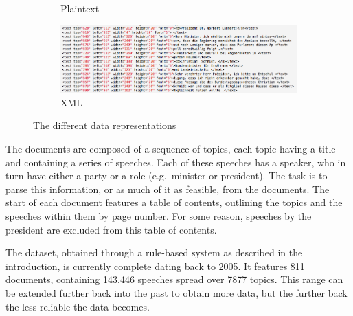\begin{figure}[htbp]
\begin{subfigure}[b]{0.59\textwidth}
    \caption{Plaintext}
    \vspace{2ex}
    \includegraphics[width=\textwidth]{figures/xml.png}
    \caption{XML}
  \end{subfigure}
  \caption{The different data representations}
  \label{fig:example}
\end{figure}

The documents are composed of a sequence of topics, each topic having a title
and containing a series of speeches. Each of these speeches has a speaker, who
in turn have either a party or a role (e.g.\ minister or president). The task is
to parse this information, or as much of it as feasible, from the documents. The
start of each document features a table of contents, outlining the topics and
the speeches within them by page number. For some reason, speeches by the
president are excluded from this table of contents.

The dataset, obtained through a rule-based system as described in the
introduction, is currently complete dating back to 2005. It features 811
documents, containing 143.446 speeches spread over 7877 topics. This range can
be extended further back into the past to obtain more data, but the further back
the less reliable the data becomes.
